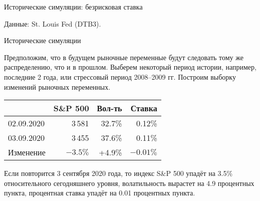 \documentclass{beamer}
\begin{document}
\begin{frame}{Исторические симуляции: безрисковая ставка}
\centering
{}

\centering
\small Данные: St. Louis Fed (DTB3).
\end{frame}



\begin{frame}{Исторические симуляции}

\justify
Предположим, что в будущем рыночные переменные будут следовать тому же распределению, что и в прошлом. Выберем некоторый период истории, например, последние 2 года, или стрессовый период 2008--2009 гг. Построим выборку изменений рыночных переменных.
 
\justify
\centering
\begin{tabular}{l|r|r|r}
           & S\&P 500 & Вол-ть   & Ставка \\ \hline
02.09.2020 & 3\,581   & 32.7\%   & 0.12\% \\
03.09.2020 & 3\,455   & 37.6\%   & 0.11\% \\ \hline
Изменение  & $-3.5\%$ & +4.9\%   & $-0.01\%$ 
\end{tabular}

\justify
Если повторится 3 сентября 2020 года, то индекс S\&P 500 упадёт на 3.5\% относительного \alert{сегодняшнего} уровня, волатильность вырастет на 4.9 процентных пункта, процентная ставка упадёт на 0.01 процентных пункта.

\end{frame}
\end{document}
